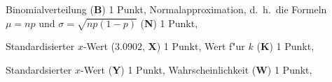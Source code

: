 \begin{bewertung}
Binomialverteilung (\textbf{B}) 1 Punkt,
Normalapproximation, d.~h.~die Formeln $\mu=np$ und $\sigma=\sqrt{np(1-p)}$
(\textbf{N}) 1 Punkt,
\begin{teilaufgaben}
\item
Standardisierter $x$-Wert ($3.0902$, \textbf{X}) 1 Punkt,
Wert f"ur $k$ (\textbf{K}) 1 Punkt,
\item
Standardsierter $x$-Wert (\textbf{Y}) 1 Punkt,
Wahrscheinlichkeit (\textbf{W}) 1 Punkt,
\end{teilaufgaben}
\end{bewertung}

